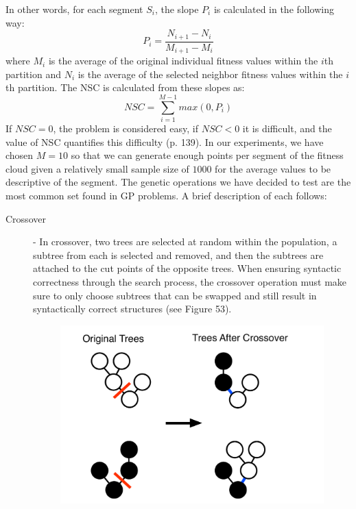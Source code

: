 \documentclass[12pt]{report} 	%
\numberwithin{figure}{chapter}
\numberwithin{table}{chapter}
\numberwithin{equation}{chapter}
\begin{document}
\begin{flushleft}
In other words, for each segment $S_i$, the slope $P_i$ is calculated in the following way:
\begin{equation}
P_i = \frac{N_{i+1}-N_i}{M_{i+1}-M_i}
\end{equation}
where $M_i$ is the average of the original individual fitness values within the $i$th partition and $N_i$ is the average of the selected neighbor fitness values within the $i$th partition. The NSC is calculated from these slopes as:
\begin{equation}
NSC = \sum_{i=1}^{M-1} max(0, P_i)
\end{equation}
If $NSC = 0$, the problem is considered easy, if $NSC < 0$ it is difficult, and the value of NSC quantifies this difficulty (p. 139). In our experiments, we have chosen $M=10$ so that we can generate enough points per segment of the fitness cloud given a relatively small sample size of $1000$ for the average values to be descriptive of the segment.
The genetic operations we have decided to test are the most common set found in GP problems. A brief description of each follows:
\begin{description}
\item [Crossover] - In crossover, two trees are selected at random within the population, a subtree from each is selected and removed, and then the subtrees are attached to the cut points of the opposite trees. When ensuring syntactic correctness through the search process, the crossover operation must make sure to only choose subtrees that can be swapped and still result in syntactically correct structures (see Figure 53). 
\begin{figure}[h!]
\begin{center}
\vspace{24pt}
\includegraphics[scale=0.5]{Crossover}

\end{center}
\end{figure}
\end{description}
\end{flushleft}
\end{document}
